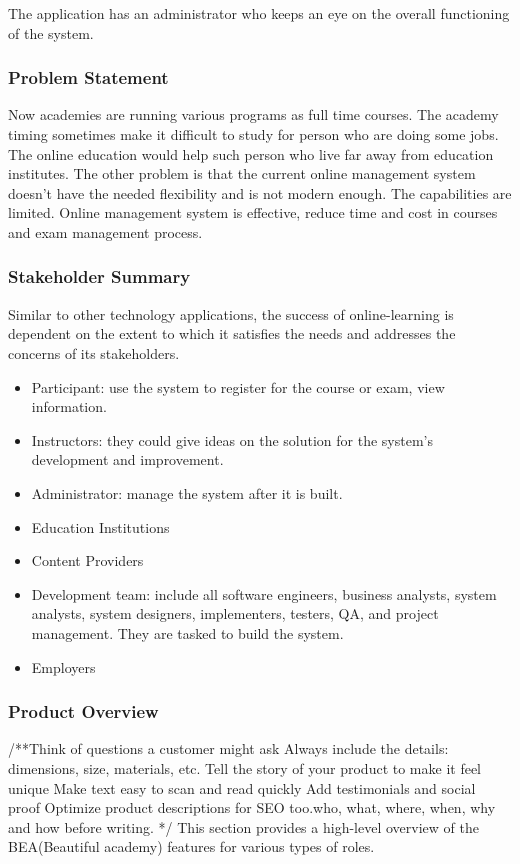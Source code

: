 \documentclass{scrartcl}
\begin{document}
The application has an administrator who keeps an eye on the overall functioning of the system.

  	
  	\subsubsection{Problem Statement}
  	Now academies are running various programs as full time courses. The academy timing sometimes make it difficult to study for person who are doing some jobs. The online education would help such person who live far away from education institutes.
The other problem is that the current online management system doesn't have the needed flexibility and is not modern enough. The capabilities are limited.
Online management system is effective, reduce time and cost in courses and exam management process.

  	\subsubsection{Stakeholder Summary}
  	Similar to other technology applications, the success of online-learning is dependent on the extent to which it satisfies the needs and addresses the concerns of its stakeholders.
  	\begin{itemize}
  	\item Participant: use the system to register for the course or exam, view 			information.
  	\item Instructors: they could give ideas on the solution for the system’s development and improvement.
  	\item Administrator: manage the system after it is built.
  	\item Education Institutions 
  	\item Content Providers
  	\item Development team: include all software engineers, business analysts, system analysts, system designers, implementers, testers, QA, and project management. They are tasked to build the system.
  	\item Employers
  	\end{itemize}
  	
  	
  	\subsubsection{Product Overview}
  	/**Think of questions a customer might ask
Always include the details: dimensions, size, materials, etc.
Tell the story of your product to make it feel unique
Make text easy to scan and read quickly
Add testimonials and social proof
Optimize product descriptions for SEO too.who, what, where, when, why and how before writing. */
  	This  section provides a high-level overview of the BEA(Beautiful academy) features for various types of roles.
  	 
\end{document}
